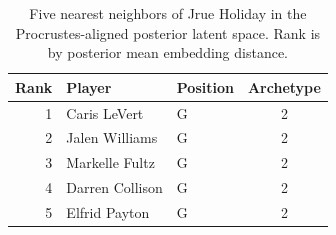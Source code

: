 \begin{table}[htbp]
  \centering\small
  \begin{tabular}{rllc}
    \toprule
    Rank & Player & Position & Archetype \\
    \midrule
    1 & Caris LeVert & G & 2 \\
    2 & Jalen Williams & G & 2 \\
    3 & Markelle Fultz & G & 2 \\
    4 & Darren Collison & G & 2 \\
    5 & Elfrid Payton & G & 2 \\
    \bottomrule
  \end{tabular}
  \caption{Five nearest neighbors of Jrue Holiday in the Procrustes-aligned posterior latent space. Rank is by posterior mean embedding distance.}
  \label{tab:Jrue_Holiday_neighbors}
\end{table}

